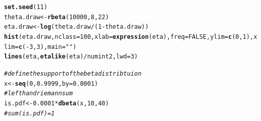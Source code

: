 \documentclass[12pt]{article}\usepackage[]{graphicx}\usepackage[]{color}
\makeatletter
\newcommand{\hlnum}[1]{\textcolor[rgb]{0.686,0.059,0.569}{#1}}%
\newcommand{\hlstr}[1]{\textcolor[rgb]{0.192,0.494,0.8}{#1}}%
\newcommand{\hlcom}[1]{\textcolor[rgb]{0.678,0.584,0.686}{\textit{#1}}}%
\newcommand{\hlopt}[1]{\textcolor[rgb]{0,0,0}{#1}}%
\newcommand{\hlstd}[1]{\textcolor[rgb]{0.345,0.345,0.345}{#1}}%
\newcommand{\hlkwb}[1]{\textcolor[rgb]{0.69,0.353,0.396}{#1}}%
\newcommand{\hlkwc}[1]{\textcolor[rgb]{0.333,0.667,0.333}{#1}}%
\newcommand{\hlkwd}[1]{\textcolor[rgb]{0.737,0.353,0.396}{\textbf{#1}}}%
\newenvironment{kframe}{%
 \def\at@end@of@kframe{}%
 \ifinner\ifhmode%
  \def\at@end@of@kframe{\end{minipage}}%
  \begin{minipage}{\columnwidth}%
 \fi\fi%
 \def\FrameCommand##1{\hskip\@totalleftmargin \hskip-\fboxsep
 \colorbox{shadecolor}{##1}\hskip-\fboxsep
     \hskip-\linewidth \hskip-\@totalleftmargin \hskip\columnwidth}%
 \MakeFramed {\advance\hsize-\width
   \@totalleftmargin\z@ \linewidth\hsize
   \@setminipage}}%
 {\par\unskip\endMakeFramed%
 \at@end@of@kframe}
\newenvironment{knitrout}{}{} %
\makeatother
\begin{document}
\begin{knitrout}\footnotesize
{}\color{fgcolor}\begin{kframe}
\begin{alltt}
\hlkwd{set.seed}\hlstd{(}\hlnum{11}\hlstd{)}
\hlstd{theta.draw} \hlkwb{<-} \hlkwd{rbeta}\hlstd{(}\hlnum{10000}\hlstd{,} \hlnum{8}\hlstd{,} \hlnum{22}\hlstd{)}
\hlstd{eta.draw} \hlkwb{<-} \hlkwd{log}\hlstd{(theta.draw}\hlopt{/}\hlstd{(}\hlnum{1}\hlopt{-}\hlstd{theta.draw))}
\hlkwd{hist}\hlstd{(eta.draw,} \hlkwc{nclass}\hlstd{=}\hlnum{100}\hlstd{,} \hlkwc{xlab}\hlstd{=}\hlkwd{expression}\hlstd{(eta),} \hlkwc{freq}\hlstd{=}\hlnum{FALSE}\hlstd{,} \hlkwc{ylim}\hlstd{=}\hlkwd{c}\hlstd{(}\hlnum{0}\hlstd{,}\hlnum{1}\hlstd{),} \hlkwc{xlim}\hlstd{=}\hlkwd{c}\hlstd{(}\hlopt{-}\hlnum{3}\hlstd{,}\hlnum{3}\hlstd{),} \hlkwc{main}\hlstd{=}\hlstr{""}\hlstd{)}
\hlkwd{lines}\hlstd{(eta,} \hlkwd{etalike}\hlstd{(eta)}\hlopt{/}\hlstd{numint2,} \hlkwc{lwd}\hlstd{=}\hlnum{3}\hlstd{)}
\end{alltt}
\end{kframe}
\end{knitrout}

\begin{knitrout}\footnotesize
{}\color{fgcolor}\begin{kframe}
\begin{alltt}
\hlcom{#define the support of the beta distribtuion}
\hlstd{x} \hlkwb{<-} \hlkwd{seq}\hlstd{(}\hlnum{0}\hlstd{,} \hlnum{0.9999}\hlstd{,} \hlkwc{by}\hlstd{=}\hlnum{0.0001}\hlstd{)}
\hlcom{#left hand riemann sum}
\hlstd{is.pdf} \hlkwb{<-} \hlnum{0.0001}\hlopt{*}\hlkwd{dbeta}\hlstd{(x,} \hlnum{10}\hlstd{,} \hlnum{40}\hlstd{)}
\hlcom{#sum(is.pdf)=1}
\end{alltt}
\end{kframe}
\end{knitrout}
\end{document}
